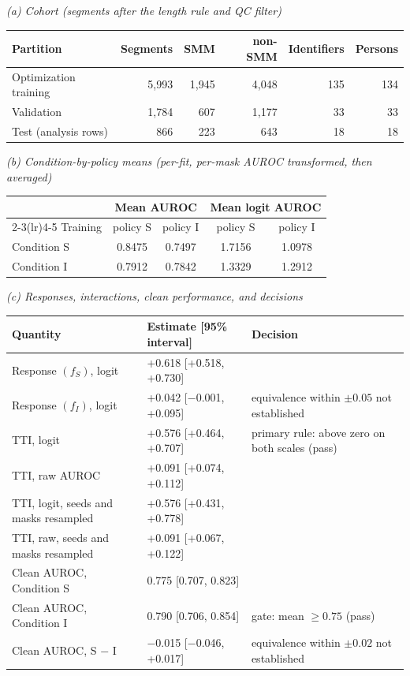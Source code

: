 \textit{(a) Cohort (segments after the length rule and QC filter)}\\[2pt]
\begin{tabular}{@{}lrrrrr@{}}
\toprule
Partition & Segments & SMM & non-SMM & Identifiers & Persons \\
\midrule
Optimization training & 5{,}993 & 1{,}945 & 4{,}048 & 135 & 134 \\
Validation & 1{,}784 & 607 & 1{,}177 & 33 & 33 \\
Test (analysis rows) & 866 & 223 & 643 & 18 & 18 \\
\bottomrule
\end{tabular}

\medskip
\textit{(b) Condition-by-policy means (per-fit, per-mask AUROC transformed, then averaged)}\\[2pt]
\begin{tabular}{@{}lcccc@{}}
\toprule
 & \multicolumn{2}{c}{Mean AUROC} & \multicolumn{2}{c}{Mean logit AUROC} \\
\cmidrule(lr){2-3}\cmidrule(lr){4-5}
Training & policy S & policy I & policy S & policy I \\
\midrule
Condition S & 0.8475 & 0.7497 & 1.7156 & 1.0978 \\
Condition I & 0.7912 & 0.7842 & 1.3329 & 1.2912 \\
\bottomrule
\end{tabular}

\medskip
\textit{(c) Responses, interactions, clean performance, and decisions}\\[2pt]
\begin{tabular}{@{}lll@{}}
\toprule
Quantity & Estimate [95\% interval] & Decision \\
\midrule
Response \R{}$(f_S)$, logit & +0.618 [+0.518, +0.730] & \\
Response \R{}$(f_I)$, logit & +0.042 [$-$0.001, +0.095] & equivalence within $\pm 0.05$ not established \\
TTI, logit & +0.576 [+0.464, +0.707] & primary rule: above zero on both scales (pass) \\
TTI, raw AUROC & +0.091 [+0.074, +0.112] & \\
TTI, logit, seeds and masks resampled & +0.576 [+0.431, +0.778] & \\
TTI, raw, seeds and masks resampled & +0.091 [+0.067, +0.122] & \\
Clean AUROC, Condition S & 0.775 [0.707, 0.823] & \\
Clean AUROC, Condition I & 0.790 [0.706, 0.854] & gate: mean $\geq 0.75$ (pass) \\
Clean AUROC, S $-$ I & $-$0.015 [$-$0.046, +0.017] & equivalence within $\pm 0.02$ not established \\
\bottomrule
\end{tabular}

